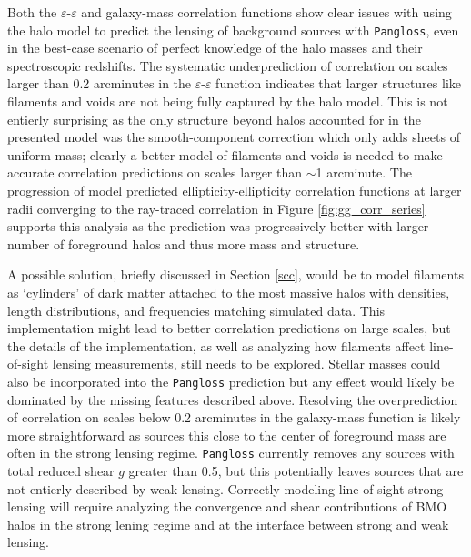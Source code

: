 \documentclass[%
 reprint,
 amsmath,amssymb,
 aps,nofootinbib
]{revtex4-1}
\begin{document}
Both the $\varepsilon$-$\varepsilon$ and galaxy-mass correlation functions show clear issues with using the halo model to predict the lensing of background sources with \texttt{Pangloss}, even in the best-case scenario of perfect knowledge of the halo masses and their spectroscopic redshifts. The systematic underprediction of correlation on scales larger than 0.2 arcminutes in the $\varepsilon$-$\varepsilon$ function indicates that larger structures like filaments and voids are not being fully captured by the halo model. This is not entierly surprising as the only structure beyond halos accounted for in the presented model was the smooth-component correction which only adds sheets of uniform mass; clearly a better model of filaments and voids is needed to make accurate correlation predictions on scales larger than $\sim$1 arcminute. The progression of model predicted ellipticity-ellipticity correlation functions at larger radii converging to the ray-traced correlation in Figure \ref{fig:gg_corr_series} supports this analysis as the prediction was progressively better with larger number of foreground halos and thus more mass and structure.

A possible solution, briefly discussed in Section \ref{scc}, would be to model filaments as `cylinders' of dark matter attached to the most massive halos with densities, length distributions, and frequencies matching simulated data. This implementation might lead to better correlation predictions on large scales, but the details of the implementation, as well as analyzing how filaments affect line-of-sight lensing measurements, still needs to be explored. Stellar masses could also be incorporated into the \texttt{Pangloss} prediction but any effect would likely be dominated by the missing features described above. Resolving the overprediction of correlation on scales below 0.2 arcminutes in the galaxy-mass function is likely more straightforward as sources this close to the center of foreground mass are often in the strong lensing regime. \texttt{Pangloss} currently removes any sources with total reduced shear $g$ greater than 0.5, but this potentially leaves sources that are not entierly described by weak lensing. Correctly modeling line-of-sight strong lensing will require analyzing the convergence and shear contributions of BMO halos in the strong lening regime and at the interface between strong and weak lensing.

\end{document}
